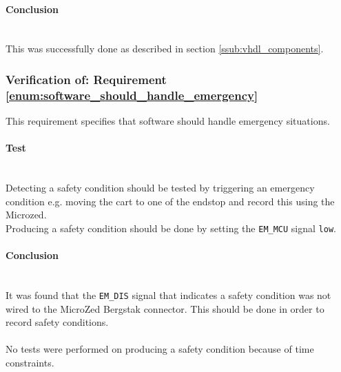 \paragraph{Conclusion}~\\
This was successfully done as described in section \ref{ssub:vhdl_components}. 

\subsubsection{Verification of: Requirement \ref{enum:software_should_handle_emergency}} %
\label{ssub:verification_of_requirement_enum:software_should_handle_emergency}
This requirement specifies that software should handle emergency situations.

\paragraph{Test}~\\
Detecting a safety condition should be tested by triggering an emergency condition e.g. moving the cart to one of the endstop and record this using the Microzed.
\\
Producing a safety condition should be done by setting the \texttt{EM\_MCU} signal \texttt{low}. 

\paragraph{Conclusion}~\\
It was found that the \texttt{EM\_DIS} signal that indicates a safety condition was not wired to the MicroZed Bergstak connector.
This should be done in order to record safety conditions.
\\~\\
No tests were performed on producing a safety condition because of time constraints.